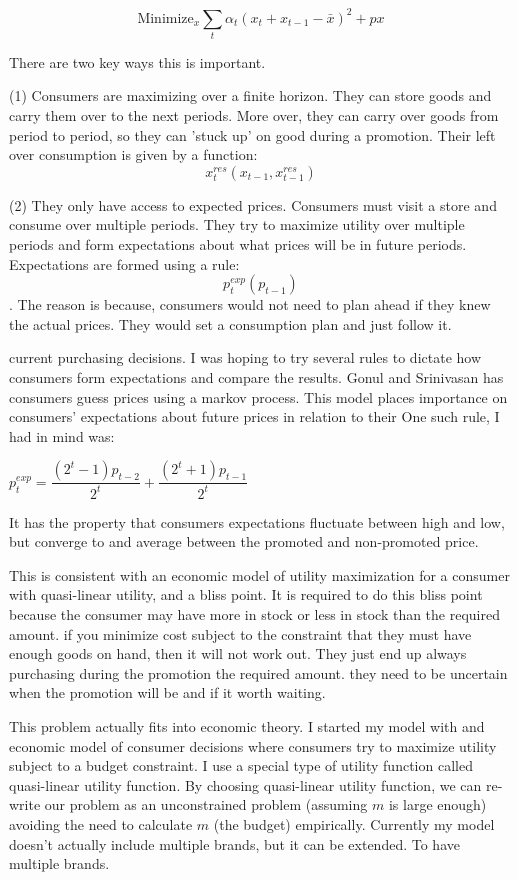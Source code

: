 \documentclass{article}
\begin{document}
$$ \text{Minimize}_{x} \sum_t \alpha_t (x_t + x_{t-1} - \bar{x})^2 + p x $$

There are two key ways this is important.

(1) Consumers are maximizing over a finite horizon. They can store goods and carry them over to the next periods. More over, they can carry over goods from period to period, so they can 'stuck up' on good during a promotion. Their left over consumption is given by a function: $$x^{res}_t(x_{t-1},x^{res}_{t-1})$$

(2) They only have access to expected prices. Consumers must visit a store and consume over multiple periods. They try to maximize utility over multiple periods and form expectations about what prices will be in future periods. Expectations are formed using a rule: $$p^{exp}_t(p_{t-1})$$. The reason is because, consumers would not need to plan ahead if they knew the actual prices. They would set a consumption plan and just follow it.


current purchasing decisions. I was hoping to try several rules to dictate how consumers form expectations and compare the results.
Gonul and Srinivasan has consumers guess prices using a markov process. This model places importance on consumers' expectations about future prices in relation to their 
One such rule, I had in mind was:

$p^{exp}_t = \dfrac {(2^t-1)p_{t-2}} {2^t} + \dfrac {(2^t+1)p_{t-1}} {2^t}$ 

It has the property that consumers expectations fluctuate between high and low, but converge to and average between the promoted and non-promoted price.




This is consistent with an economic model of utility maximization for a consumer with quasi-linear utility, and a bliss point. It is required to do this bliss point because the consumer may have more in stock or less in stock than the required amount. if you minimize cost subject to the constraint that they must have enough goods on hand, then it will not work out. They just end up always purchasing during the promotion the required amount. they need to be uncertain when the promotion will be and if it worth waiting.


This problem actually fits into economic theory. I started my model with and economic model of consumer decisions where consumers try to maximize utility subject to a budget constraint. I use a special type of utility function called quasi-linear utility function. By choosing quasi-linear utility function, we can re-write our problem as an unconstrained problem (assuming $m$ is large enough) avoiding the need to calculate $m$ (the budget) empirically. 
Currently my model doesn't actually include multiple brands, but it can be extended. To have multiple brands.
\end{document}
